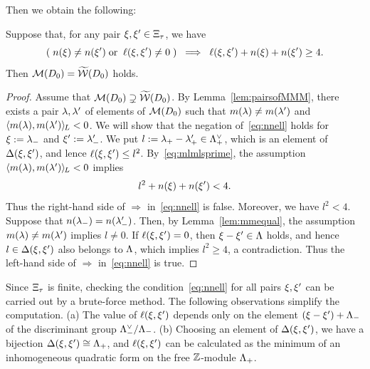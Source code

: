\documentclass{amsart} %
\begin{document}
Then we obtain the following:
%
\begin{lemma}\label{lem:MMMtilwalls}
Suppose that, for any pair $\xi, \xi^{\prime}\in \Xi_{\tau}$,
we have
%
\begin{equation}\label{eq:nnell}
(\;n(\xi)\ne n(\xi^{\prime}) \; \textrm{\rm or}\; \;\ell(\xi, \xi^{\prime})\ne 0 \;)\;\;\Longrightarrow\;\; \ell(\xi, \xi^{\prime})+n(\xi)+n(\xi^{\prime})\ge 4.
\end{equation}
%
Then $\mathord{\mathcal{M}}(D_0)=\widetilde{\mathord{\mathcal{W}}} (D_0)$ holds.
\end{lemma}
%
\begin{proof}
Assume that $\mathord{\mathcal{M}}(D_0)\supsetneq\widetilde{\mathord{\mathcal{W}}} (D_0)$.
By Lemma~\ref{lem:pairsofMMM},
there exists a pair $\lambda, \lambda^{\prime}$ of elements of $ \mathord{\mathcal{M}}(D_0)$
such that $m(\lambda)\ne m(\lambda^{\prime})$ and $ \langle m(\lambda), m(\lambda^{\prime}) \rangle_{\hskip -1pt L} <0$.
We will show that the negation of~\eqref{eq:nnell} holds for
$\xi:={\lambda}_{-}$ and $\xi^{\prime}:={\lambda}_{-}^{\prime}$.
We put $l:={\lambda}_{+}-{\lambda}_{+}^{\prime}\in \Lambda_{+}^{\vee}$,
which is an element of $\Delta(\xi, \xi^{\prime})$,
and lence $\ell(\xi, \xi^{\prime})\le l^2$.
By~\eqref{eq:mlmlsprime},
the assumption $ \langle m(\lambda), m(\lambda^{\prime}) \rangle_{\hskip -1pt L} <0$ implies 
%
\begin{equation*}\label{eq:lnn}
l^2+n(\xi)+n(\xi^{\prime})<4.
\end{equation*}
%
Thus the right-hand side of $\Longrightarrow$ in~\eqref{eq:nnell} is false.
Moreover, we have $l^2<4$.
Suppose that $n({\lambda}_{-})=n({\lambda}_{-}^{\prime})$.
Then, by Lemma~\ref{lem:mmequal},
the assumption $m(\lambda)\ne m(\lambda^{\prime})$ implies $l\ne 0$.
If $\ell(\xi, \xi^{\prime})= 0$, then 
$\xi-\xi^{\prime}\in \Lambda$ holds, and hence 
$l\in \Delta(\xi, \xi^{\prime})$ also belongs to $\Lambda$,
which implies $l^2\ge 4$, a contradiction.
Thus the left-hand side of $\Longrightarrow$ in~\eqref{eq:nnell} is true.
\end{proof}
%
\begin{remark}\label{rem:MMMtilwalls}
Since $\Xi_{\tau}$ is finite,
checking the condition~\eqref{eq:nnell} for all pairs $\xi, \xi^{\prime}$
 can be carried out by a brute-force method.
The following observations simplify the computation.
(a) 
The value of $\ell(\xi, \xi^{\prime})$ depends only on the element $(\xi-\xi^{\prime})+\Lambda_{-}$
of the discriminant group $\Lambda_{-}^{\vee}/\Lambda_{-}$.
(b) 
Choosing an element of $\Delta(\xi, \xi^{\prime})$, 
we have a bijection $\Delta(\xi, \xi^{\prime})\cong \Lambda_{+}$,
and $\ell(\xi, \xi^{\prime})$ can be calculated as the minimum of
an inhomogeneous quadratic form on the free $\mathord{\mathbb{Z}}$-module $\Lambda_{+}$.
\end{remark}
\end{document}
